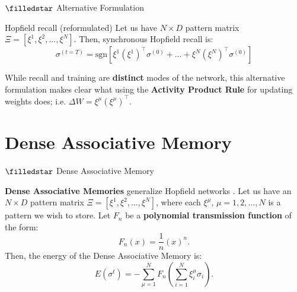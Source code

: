 \documentclass[]{beamer}
\begin{document}
\begin{frame}{$\filledstar$ Alternative Formulation}
  \begin{block}{Hopfield recall (reformulated)}
    Let us have $N \times D$ pattern matrix $\Xi = [\xi^1, \xi^2,
    \dots, \xi^N]$.
    Then, synchronous Hopfield recall is:
    $$
    \sigma^{(t=T)} = \text{sgn} \left[ \xi^1 (\xi^1)^\top
    \sigma^{(0)} + \dots + \xi^N (\xi^N)^\top \sigma^{(0)} \right]
    $$
  \end{block}

  While recall and training are \textbf{distinct} modes of the network, this
  alternative formulation makes clear what using the \textbf{Activity
  Product Rule}
  for updating weights does; i.e. $\Delta W = \xi^\mu (\xi^\mu)^\top$.
\end{frame}

\section{Dense Associative Memory}
\begin{frame}{$\filledstar$ Dense Associative Memory}
  \begin{definition}\label{def:dam}
    \textbf{Dense Associative Memories} generalize Hopfield networks
    \parencites{krotov_dense_2016,demircigil_model_2017}.
    Let us have an $N \times D$ pattern matrix $\Xi = [\xi^1, \xi^2,
    \dots, \xi^N]$, where each $\xi^\mu$, $\mu = 1, 2, \dots, N$
    is a pattern we wish to store. Let $F_n$ be a \textbf{polynomial
    transmission function} of the form:
    $$
    F_n (x) = \frac{1}{n} (x)^n.
    $$
    Then, the energy of the Dense Associative Memory is:
    $$
    E(\sigma^t) = - \sum^N_{\mu = 1} F_n \left( \sum^N_{i = 1}
    \xi^\mu_i \sigma_i \right).
    $$
  \end{definition}
\end{frame}
\end{document}
